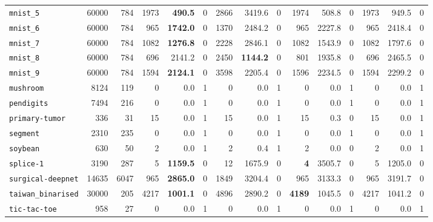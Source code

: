 \begin{tabular}{lccrrrrrrrrrrrr}
\texttt{mnist\_5} & \multicolumn{1}{r}{60000} & \multicolumn{1}{r}{784}  & 1973 & \textbf{490.5} & 0 & 2866 & 3419.6 & 0 & 1974 & 508.8 & 0 & 1973 & 949.5 & 0\\
\texttt{mnist\_6} & \multicolumn{1}{r}{60000} & \multicolumn{1}{r}{784}  & 965 & \textbf{1742.0} & 0 & 1370 & 2484.2 & 0 & 965 & 2227.8 & 0 & 965 & 2418.4 & 0\\
\texttt{mnist\_7} & \multicolumn{1}{r}{60000} & \multicolumn{1}{r}{784}  & 1082 & \textbf{1276.8} & 0 & 2228 & 2846.1 & 0 & 1082 & 1543.9 & 0 & 1082 & 1797.6 & 0\\
\texttt{mnist\_8} & \multicolumn{1}{r}{60000} & \multicolumn{1}{r}{784}  & 696 & 2141.2 & 0 & 2450 & \textbf{1144.2} & 0 & 801 & 1935.8 & 0 & 696 & 2465.5 & 0\\
\texttt{mnist\_9} & \multicolumn{1}{r}{60000} & \multicolumn{1}{r}{784}  & 1594 & \textbf{2124.1} & 0 & 3598 & 2205.4 & 0 & 1596 & 2234.5 & 0 & 1594 & 2299.2 & 0\\
\texttt{mushroom} & \multicolumn{1}{r}{8124} & \multicolumn{1}{r}{119}  & 0 & 0.0 & 1 & 0 & 0.0 & 1 & 0 & 0.0 & 1 & 0 & 0.0 & 1\\
\texttt{pendigits} & \multicolumn{1}{r}{7494} & \multicolumn{1}{r}{216}  & 0 & 0.0 & 1 & 0 & 0.0 & 1 & 0 & 0.0 & 1 & 0 & 0.0 & 1\\
\texttt{primary-tumor} & \multicolumn{1}{r}{336} & \multicolumn{1}{r}{31}  & 15 & 0.0 & 1 & 15 & 0.0 & 1 & 15 & 0.3 & 0 & 15 & 0.0 & 1\\
\texttt{segment} & \multicolumn{1}{r}{2310} & \multicolumn{1}{r}{235}  & 0 & 0.0 & 1 & 0 & 0.0 & 1 & 0 & 0.0 & 1 & 0 & 0.0 & 1\\
\texttt{soybean} & \multicolumn{1}{r}{630} & \multicolumn{1}{r}{50}  & 2 & 0.0 & 1 & 2 & 0.4 & 1 & 2 & 0.0 & 0 & 2 & 0.0 & 1\\
\texttt{splice-1} & \multicolumn{1}{r}{3190} & \multicolumn{1}{r}{287}  & 5 & \textbf{1159.5} & 0 & 12 & 1675.9 & 0 & \textbf{4} & 3505.7 & 0 & 5 & 1205.0 & 0\\
\texttt{surgical-deepnet} & \multicolumn{1}{r}{14635} & \multicolumn{1}{r}{6047}  & 965 & \textbf{2865.0} & 0 & 1849 & 3204.4 & 0 & 965 & 3133.3 & 0 & 965 & 3191.7 & 0\\
\texttt{taiwan\_binarised} & \multicolumn{1}{r}{30000} & \multicolumn{1}{r}{205}  & 4217 & \textbf{1001.1} & 0 & 4896 & 2890.2 & 0 & \textbf{4189} & 1045.5 & 0 & 4217 & 1041.2 & 0\\
\texttt{tic-tac-toe} & \multicolumn{1}{r}{958} & \multicolumn{1}{r}{27}  & 0 & 0.0 & 1 & 0 & 0.0 & 1 & 0 & 0.0 & 1 & 0 & 0.0 & 1\\

\end{tabular}
